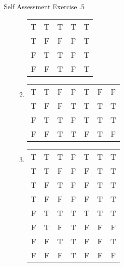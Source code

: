 \documentclass[../notes.tex]{subfiles}
\begin{document}
\begin{exercise}{Self Assessment Exercise \thechapter.5}
\begin{enumerate}
\begin{enumerate}
\begin{center}
\begin{tabular}{| c c | c | c | c |}
										\hline
										T & T & T & T & T\\
										T & F & F & F & T\\
										F & T & T & F & T\\
										F & F & T & F & T\\
										\hline
									\end{tabular}
								\end{center}
							\item {}
								\begin{center}
									\begin{tabular}{|c c | c c | c | c | c |}
										\hline
										\tablehead{$p$} & \tablehead{$q$} & \tablehead{$\lnot p$} & \tablehead{$\lnot q$} & \tablehead{$p \lor q$} & \tablehead{$\lnot p \lor \lnot q$} & \tablehead{$(p \lor q) \land (\lnot p \lor \lnot q)$}\\
										\hline
										T & T & F & F & T & F & F\\
										T & F & F & T & T & T & T\\
										F & T & T & F & T & T & T\\
										F & F & T & T & F & T & F\\
										\hline
									\end{tabular}
								\end{center}
							\pagebreak
							\item \question{$\bigl(\lnot p \rightarrow [q \land r]\bigr) \lor r$}
								\begin{center}
									\begin{tabular}{|c c c | c | c | c | c|}
										\hline
										\tablehead{$p$} & \tablehead{$q$} & \tablehead{$r$} & \tablehead{$\lnot p$} & \tablehead{$q \land r$} & \tablehead{$\lnot p \rightarrow (q \land r)$} & \tablehead{$[\lnot p \rightarrow (q \land r)] \lor r$}\\
										\hline
										T & T & T & F & T & T & T\\
										T & T & F & F & F & T & T\\
										T & F & T & F & F & T & T\\
										T & F & F & F & F & T & T\\
										F & T & T & T & T & T & T\\
										F & T & F & T & F & F & F\\
										F & F & T & T & F & F & T\\
										F & F & F & T & F & F & F\\

\end{tabular}
\end{center}
\end{enumerate}
\end{enumerate}
\end{exercise}
\end{document}
